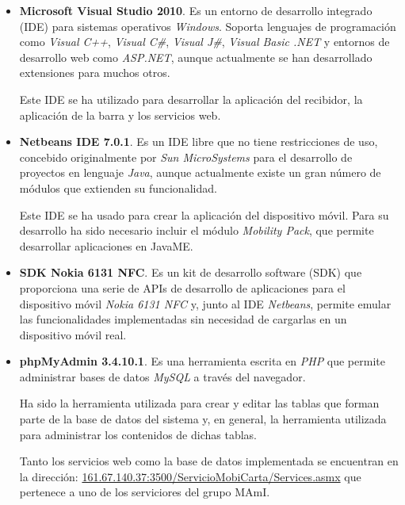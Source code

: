   \begin{itemize}
    \item \textbf{Microsoft Visual Studio 2010}.
    Es un entorno de desarrollo integrado (\acs{IDE}) para sistemas operativos
    \emph{Windows}. Soporta lenguajes de programación como \emph{Visual C++},
    \emph{Visual C\#}, \emph{Visual J\#}, \emph{Visual Basic .NET} y
    entornos de desarrollo web como \emph{ASP.NET}, aunque actualmente
    se han desarrollado extensiones para muchos otros.

    Este \acs{IDE} se ha utilizado para desarrollar la aplicación del
    recibidor, la aplicación de la barra y los servicios web.
    
    \item \textbf{Netbeans IDE 7.0.1}.
    Es un \acs{IDE} libre que no tiene restricciones de uso, concebido 
    originalmente por \emph{Sun MicroSystems} para el desarrollo de proyectos
    en lenguaje \emph{Java}, aunque actualmente existe un gran número de 
    módulos que extienden su funcionalidad.

    Este \acs{IDE} se ha usado para crear la aplicación del dispositivo móvil.
    Para su desarrollo ha sido necesario incluir el módulo \emph{Mobility 
    Pack}, que permite desarrollar aplicaciones en \acs{JavaME}.

    \item \textbf{SDK Nokia 6131 NFC}. 
    Es un kit de desarrollo software (\acs{SDK}) que proporciona una serie
    de \acs{API}s de desarrollo de aplicaciones para el dispositivo móvil
    \emph{Nokia 6131 \acs{NFC}} y, junto al \acs{IDE} \emph{Netbeans},
    permite emular las funcionalidades implementadas sin necesidad de
    cargarlas en un dispositivo móvil real.
    
    \item \textbf{phpMyAdmin 3.4.10.1}.
    Es una herramienta escrita en \emph{PHP} que permite administrar bases
    de datos \emph{MySQL} a través del navegador.

    Ha sido la herramienta utilizada para crear y editar las tablas que
    forman parte de la base de datos del sistema y, en general, la herramienta
    utilizada para administrar los contenidos de dichas tablas.

    Tanto los servicios web como la base de datos implementada se encuentran 
    en la dirección: \url{161.67.140.37:3500/ServicioMobiCarta/Services.asmx}
    que pertenece a uno de los serviciores del grupo \acs{MAmI}. %
  \end{itemize}

